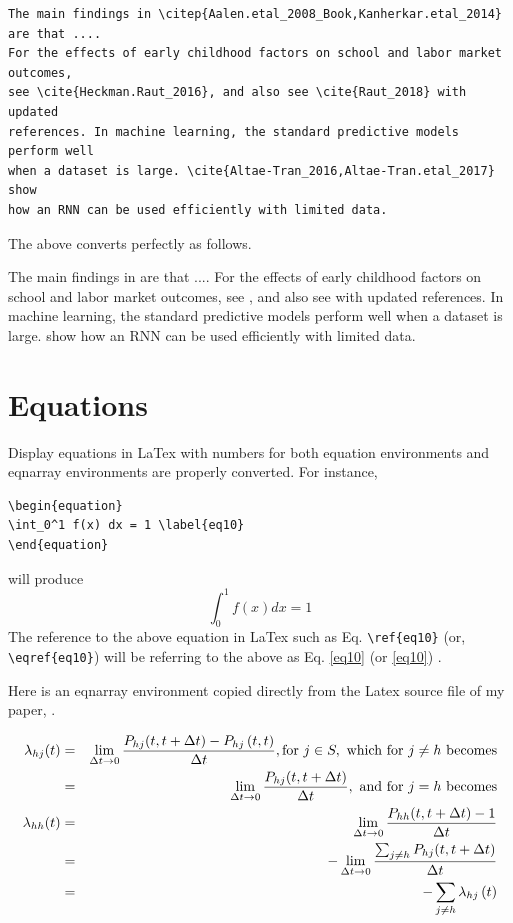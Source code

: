 \documentclass[12pt,svgnames]{article}
\begin{document}
\begin{verbatim}
The main findings in \citep{Aalen.etal_2008_Book,Kanherkar.etal_2014} are that .... 
For the effects of early childhood factors on school and labor market outcomes, 
see \cite{Heckman.Raut_2016}, and also see \cite{Raut_2018} with updated 
references. In machine learning, the standard predictive models perform well
when a dataset is large. \cite{Altae-Tran_2016,Altae-Tran.etal_2017} show 
how an RNN can be used efficiently with limited data.
\end{verbatim}

The above converts perfectly as follows.

The main findings in \citep{Aalen.etal_2008_Book,Kanherkar.etal_2014} are that .... 
For the effects of early childhood factors on school and labor market outcomes, 
see \cite{Heckman.Raut_2016}, and also see \cite{Raut_2018} with updated 
references. In machine learning, the standard predictive models perform well
when a dataset is large. \cite{Altae-Tran_2016,Altae-Tran.etal_2017} show 
how an RNN can be used efficiently with limited data.

\section{Equations}\label{sec4}

Display equations in LaTex with numbers for both equation environments and eqnarray environments are properly converted.  For instance,
\begin{verbatim}
\begin{equation}
\int_0^1 f(x) dx = 1 \label{eq10}
\end{equation}
\end{verbatim}
will produce 
\begin{equation}
\int_0^1 f(x) dx = 1 \label{eq10}
\end{equation}
The reference to the above equation in LaTex such as Eq. \verb&\ref{eq10}& (or, \verb&\eqref{eq10}&) will be referring to the above as Eq. \ref{eq10} (or \eqref{eq10}) .
 
Here is an eqnarray environment copied directly from the Latex source file of my paper, \cite{Raut_2019}. 

\begin{eqnarray}
\lambda _{hj}(t) &=&\lim_{\Delta t\rightarrow 0}\frac{P_{hj}(t,t+\Delta
t)-P_{hj}\left( t,t\right) }{\Delta t},\text{for }j\in S,\text{ which for }%
j\neq h\text{ becomes}  \notag \\
&=&\lim_{\Delta t\rightarrow 0}\frac{P_{hj}(t,t+\Delta t)}{\Delta t},\text{
and for }j=h\text{ becomes}  \notag \\
\lambda _{hh}(t) &=&\lim_{\Delta t\rightarrow 0}\frac{P_{hh}(t,t+\Delta t)-1%
}{\Delta t}  \label{eq3} \\
&=&-\lim_{\Delta t\rightarrow 0}\frac{\sum_{j\neq h}P_{hj}(t,t+\Delta t)}{%
\Delta t}  \notag \\
&=&-\sum_{j\neq h}\lambda _{hj}\left( t\right)   \notag
\end{eqnarray}%
\end{document}
